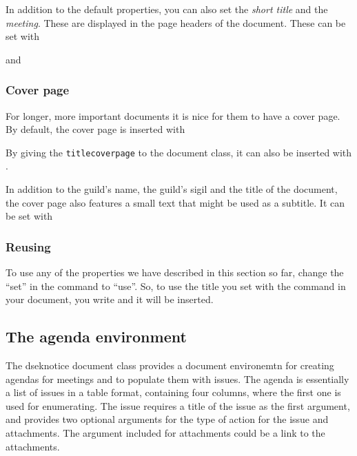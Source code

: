 \documentclass[a4paper, oneside]{ltxdoc}
\begin{document}
In addition to the default properties, you can also set the \emph{short title}
and the \emph{meeting}.  These are displayed in the page headers of the
document.  These can be set with

\begin{center}
   and 
\end{center}

\subsubsection{Cover page}
For longer, more important documents it is nice for them to have a cover page.
By default, the cover page is inserted with

\begin{center}
\end{center}

By giving the \texttt{titlecoverpage} to the document class, it can also be
inserted with .

In addition to the guild's name, the guild's sigil and the title of the
document, the cover page also features a small text that might be used as a
subtitle.  It can be set with

\begin{center}
\end{center}

\subsubsection{Reusing}
To use any of the properties we have described in this section so far, change
the ``set'' in the command to ``use''.  So, to use the title you set with the
 command in your document, you write  and it will be
inserted.

\subsection{The agenda environment}
The \textsf{dseknotice} document class provides a document environemtn for
creating agendas for meetings and to populate them with issues.  The agenda is
essentially a list of issues in a table format, containing four columns, where
the first one is used for enumerating. The \textsf{issue} requires a title of
the issue as the first argument, and provides two optional arguments for the
type of action for the issue and attachments. The argument included for
attachments could be a link to the attachments.
\end{document}
